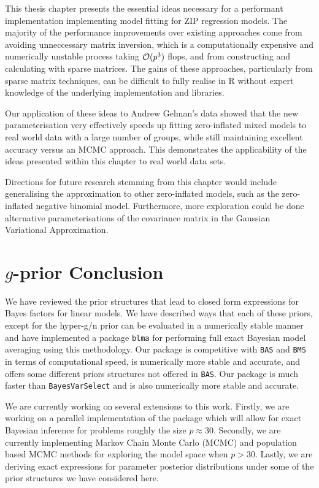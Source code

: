 This thesis chapter presents the essential ideas necessary for a performant implementation implementing model 
fitting for ZIP regression models.
The majority of the performance improvements over existing approaches come from avoiding unneccessary matrix
inversion, which is a computationally expensive and numerically unstable process taking $\mathcal{O}(p^3)$ flops,
and  from constructing and calculating with sparse matrices. The gains of these approaches, particularly from
sparse  matrix techniques, can be difficult to fully realise in R without expert knowledge of the underlying
implementation and libraries.
		
Our application of these ideas to Andrew Gelman's data showed that the new parameterisation very effectively
speeds up fitting zero-inflated mixed models to real world data with a large number of groups, while still
maintaining excellent accuracy versus an MCMC approach. This demonstrates the applicability of the ideas
presented within this chapter to real world data sets.
		
Directions for future research stemming from this chapter would include generalising the approximation to
other zero-inflated models, such as the zero-inflated negative binomial model. Furthermore, more exploration
could be done alternative parameterisations of the covariance matrix in the Gaussian Variational
Approximation.

\section{$g$-prior Conclusion}

We have reviewed the prior structures that lead to closed form expressions for Bayes factors for linear
models. We have described ways that each of these priors, except for the hyper-g/n prior can be evaluated in a
numerically stable manner and have implemented a package \texttt{blma} for performing full exact Bayesian
model averaging using this methodology. Our package is competitive with \texttt{BAS} and \texttt{BMS} in terms
of computational speed, is numerically more stable and accurate, and offers some different priors structures
not offered in \texttt{BAS}. Our package is much faster than \texttt{BayesVarSelect} and is also numerically
more stable and accurate.

We are currently working on several extensions to this work. Firstly, we are working on a parallel
implementation of the package which will allow for exact Bayesian inference for problems roughly the size $p
\approx 30$. Secondly, we are currently implementing Markov Chain Monte Carlo (MCMC) and population based MCMC
methods for exploring the model space when $p > 30$. Lastly, we are deriving exact expressions for parameter
posterior distributions under some of the prior structures we have considered here.

